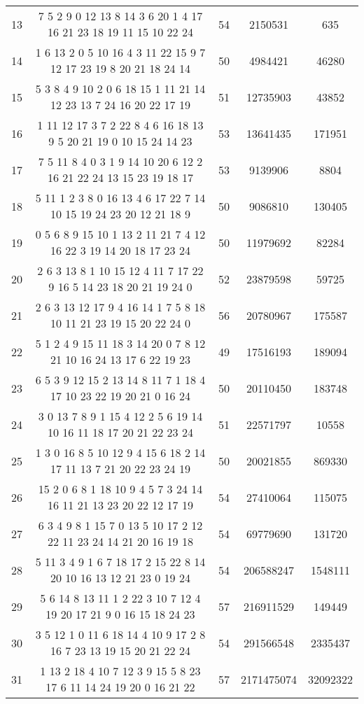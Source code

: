 \documentclass[a4paper,11pt,oneside,openany]{jsbook}
\begin{document}
\begin{table}[]
{\begin{tabular}{|c|c|c|c|c|}
13 & 7 5 2 9 0 12 13 8 14 3 6 20 1 4 17 16 21 23 18 19 11 15 10 22 24  & 54 & 2150531 & 635 \\
14 & 1 6 13 2 0 5 10 16 4 3 11 22 15 9 7 12 17 23 19 8 20 21 18 24 14  & 50 & 4984421 & 46280 \\
15 & 5 3 8 4 9 10 2 0 6 18 15 1 11 21 14 12 23 13 7 24 16 20 22 17 19  & 51 & 12735903 & 43852 \\
16 & 1 11 12 17 3 7 2 22 8 4 6 16 18 13 9 5 20 21 19 0 10 15 24 14 23  & 53 & 13641435 & 171951 \\
17 & 7 5 11 8 4 0 3 1 9 14 10 20 6 12 2 16 21 22 24 13 15 23 19 18 17  & 53 & 9139906 & 8804 \\
18 & 5 11 1 2 3 8 0 16 13 4 6 17 22 7 14 10 15 19 24 23 20 12 21 18 9  & 50 & 9086810 & 130405 \\
19 & 0 5 6 8 9 15 10 1 13 2 11 21 7 4 12 16 22 3 19 14 20 18 17 23 24  & 50 & 11979692 & 82284 \\
20 & 2 6 3 13 8 1 10 15 12 4 11 7 17 22 9 16 5 14 23 18 20 21 19 24 0  & 52 & 23879598 & 59725 \\
21 & 2 6 3 13 12 17 9 4 16 14 1 7 5 8 18 10 11 21 23 19 15 20 22 24 0  & 56 & 20780967 & 175587 \\
22 & 5 1 2 4 9 15 11 18 3 14 20 0 7 8 12 21 10 16 24 13 17 6 22 19 23  & 49 & 17516193 & 189094 \\
23 & 6 5 3 9 12 15 2 13 14 8 11 7 1 18 4 17 10 23 22 19 20 21 0 16 24  & 50 & 20110450 & 183748 \\
24 & 3 0 13 7 8 9 1 15 4 12 2 5 6 19 14 10 16 11 18 17 20 21 22 23 24  & 51 & 22571797 & 10558 \\
25 & 1 3 0 16 8 5 10 12 9 4 15 6 18 2 14 17 11 13 7 21 20 22 23 24 19  & 50 & 20021855 & 869330 \\
26 & 15 2 0 6 8 1 18 10 9 4 5 7 3 24 14 16 11 21 13 23 20 22 12 17 19  & 54 & 27410064 & 115075 \\
27 & 6 3 4 9 8 1 15 7 0 13 5 10 17 2 12 22 11 23 24 14 21 20 16 19 18  & 54 & 69779690 & 131720 \\
28 & 5 11 3 4 9 1 6 7 18 17 2 15 22 8 14 20 10 16 13 12 21 23 0 19 24  & 54 & 206588247 & 1548111 \\
29 & 5 6 14 8 13 11 1 2 22 3 10 7 12 4 19 20 17 21 9 0 16 15 18 24 23  & 57 & 216911529 & 149449 \\
30 & 3 5 12 1 0 11 6 18 14 4 10 9 17 2 8 16 7 23 13 19 15 20 21 22 24  & 54 & 291566548 & 2335437 \\
31 & 1 13 2 18 4 10 7 12 3 9 15 5 8 23 17 6 11 14 24 19 20 0 16 21 22  & 57 & 2171475074 & 32092322 \\

\end{tabular}}
\end{table}
\end{document}
